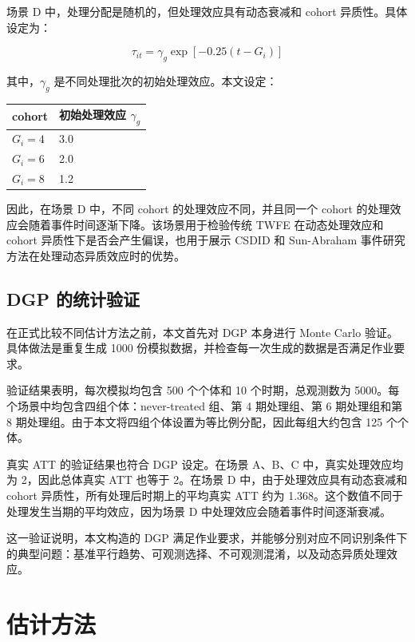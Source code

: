 \documentclass[
  fontset=windows]{ctexart}
\newcounter{none} %
\begin{document}
场景 D 中，处理分配是随机的，但处理效应具有动态衰减和 cohort
异质性。具体设定为：

\[
\tau_{it}=\gamma_g\exp[-0.25(t-G_i)]
\]

其中，\(\gamma_g\) 是不同处理批次的初始处理效应。本文设定：

{\def\LTcaptype{none} %
\begin{longtable}[]{@{}ll@{}}
\toprule\noalign{}
cohort & 初始处理效应 \(\gamma_g\) \\
\midrule\noalign{}
\endhead
\bottomrule\noalign{}
\endlastfoot
\(G_i=4\) & 3.0 \\
\(G_i=6\) & 2.0 \\
\(G_i=8\) & 1.2 \\
\end{longtable}
}

因此，在场景 D 中，不同 cohort 的处理效应不同，并且同一个 cohort
的处理效应会随着事件时间逐渐下降。该场景用于检验传统 TWFE
在动态处理效应和 cohort 异质性下是否会产生偏误，也用于展示 CSDID 和
Sun-Abraham 事件研究方法在处理动态异质效应时的优势。

\subsection{DGP 的统计验证}\label{dgp-ux7684ux7edfux8ba1ux9a8cux8bc1}

在正式比较不同估计方法之前，本文首先对 DGP 本身进行 Monte Carlo
验证。具体做法是重复生成 1000
份模拟数据，并检查每一次生成的数据是否满足作业要求。

验证结果表明，每次模拟均包含 500 个个体和 10 个时期，总观测数为
5000。每个场景中均包含四组个体：never-treated 组、第 4 期处理组、第 6
期处理组和第 8
期处理组。由于本文将四组个体设置为等比例分配，因此每组大约包含 125
个个体。

真实 ATT 的验证结果也符合 DGP 设定。在场景 A、B、C 中，真实处理效应均为
2，因此总体真实 ATT 也等于 2。在场景 D 中，由于处理效应具有动态衰减和
cohort 异质性，所有处理后时期上的平均真实 ATT 约为
1.368。这个数值不同于处理发生当期的平均效应，因为场景 D
中处理效应会随着事件时间逐渐衰减。

这一验证说明，本文构造的 DGP
满足作业要求，并能够分别对应不同识别条件下的典型问题：基准平行趋势、可观测选择、不可观测混淆，以及动态异质处理效应。

\section{估计方法}\label{ux4f30ux8ba1ux65b9ux6cd5}
\end{document}
